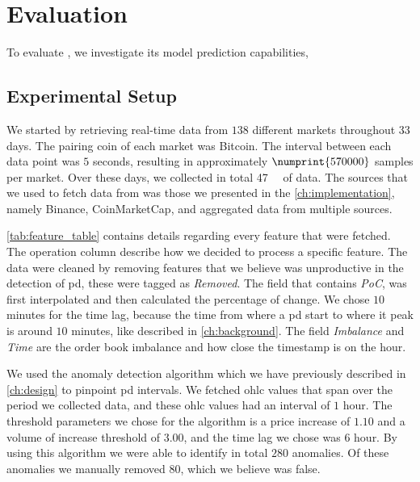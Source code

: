 
\chapter{Evaluation}\label{ch:evaluation}\glsresetall
To evaluate \project, we investigate its model prediction capabilities,






\section{Experimental Setup}\label{sec:experimental_setup}
We started by retrieving real-time data from $138$ different markets throughout $33$ days. The pairing coin of each market was Bitcoin. The interval between each data point was $5$ seconds, resulting in approximately $\numprint{570 000}$ samples per market. Over these days, we collected in total \SI{47}{\giga\byte} of data. The sources that we used to fetch data from was those we presented in the \autoref{ch:implementation}, namely Binance, CoinMarketCap, and aggregated data from multiple sources. 

\autoref{tab:feature_table} contains details regarding every feature that were fetched. The operation column describe how we decided to process a specific feature. The data were cleaned by removing features that we believe was unproductive in the detection of \ac{pd}, these were tagged as \emph{Removed}. The field that contains \emph{PoC}, was first interpolated and then calculated the percentage of change. We chose $10$ minutes for the time lag, because the time from where a \ac{pd} start to where it peak is around $10$ minutes, like described in \autoref{ch:background}. The field \emph{Imbalance} and \emph{Time} are the order book imbalance and how close the timestamp is on the hour.



We used the anomaly detection algorithm which we have previously described in \autoref{ch:design} to pinpoint \ac{pd} intervals. We fetched \ac{ohlc} values that span over the period we collected data, and these \ac{ohlc} values had an interval of $1$ hour. The threshold parameters we chose for the algorithm is a price increase of $1.10$ and a volume of increase threshold of $3.00$, and the time lag we chose was $6$ hour. By using this algorithm we were able to identify in total $280$ anomalies. Of these anomalies we manually removed $80$, which we believe was false.

